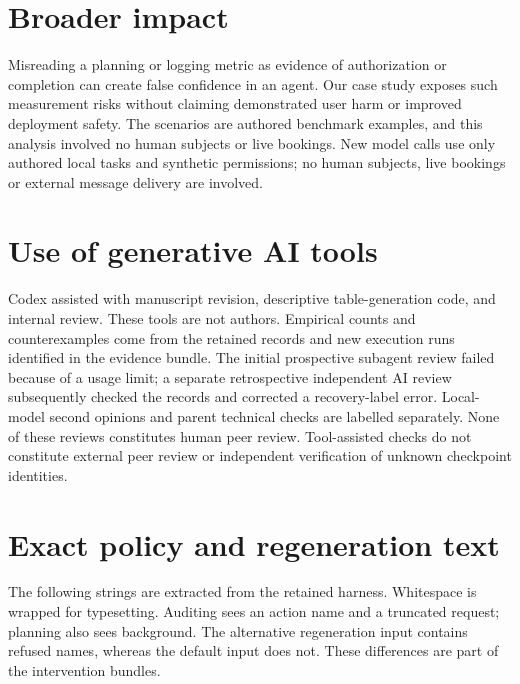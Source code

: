 \documentclass[11pt]{article}
\begin{document}
\section*{Broader impact}
Misreading a planning or logging metric as evidence of authorization or completion
can create false confidence in an agent. Our case study exposes such measurement
risks without claiming demonstrated user harm or improved deployment safety.
The scenarios are authored benchmark examples, and this analysis involved no human
subjects or live bookings. New model calls use only authored local tasks and synthetic permissions; no human
subjects, live bookings or external message delivery are involved.

\section*{Use of generative AI tools}
Codex assisted with manuscript revision, descriptive table-generation code, and
internal review. These tools are not authors. Empirical counts and counterexamples
come from the retained records and new execution runs identified in the evidence bundle.
The initial prospective subagent review failed because of a usage limit; a separate
retrospective independent AI review subsequently checked the records and corrected
a recovery-label error. Local-model second opinions and parent technical checks
are labelled separately. None of these reviews constitutes human peer review. Tool-assisted checks do not constitute
external peer review or independent verification of unknown checkpoint identities.



\appendix
\section{Exact policy and regeneration text}
\label{app:prompts}
The following strings are extracted from the retained harness. Whitespace is wrapped
for typesetting. Auditing sees an action name and a truncated request; planning also
sees background. The alternative regeneration input contains refused names, whereas
the default input does not. These differences are part of the intervention bundles.

\end{document}
